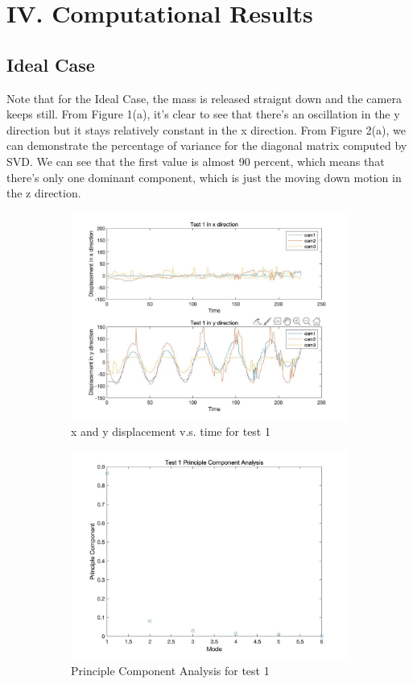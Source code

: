 \documentclass[12pt,letterpaper]{article}
\begin{document}
\section*{IV. Computational Results}
\subsection*{Ideal Case}
Note that for the Ideal Case, the mass is released straignt down and the camera keeps still. From Figure 1(a), it's clear to see that there's an oscillation in the y direction but it stays relatively constant in the x direction. From Figure 2(a), we can demonstrate the percentage of variance for the diagonal matrix computed by SVD. We can see that the first value is almost 90 percent, which means that there's only one dominant component, which is just the moving down motion in the z direction. 
\begin{figure}[ht]
\begin{subfigure}{.5\textwidth}
  \centering
  \includegraphics[width=0.9\linewidth]{1-a.jpg}  
  \caption{x and y displacement v.s. time for test 1}
  \label{fig:sub-first}
\end{subfigure}
\begin{subfigure}{.5\textwidth}
  \centering
  \includegraphics[width=0.9\linewidth]{1-b.jpg}  
  \caption{Principle Component Analysis for test 1}
  \label{fig:sub-second}
\end{subfigure}
\label{fig:fig}
\caption{}
\end{figure}
\end{document}
